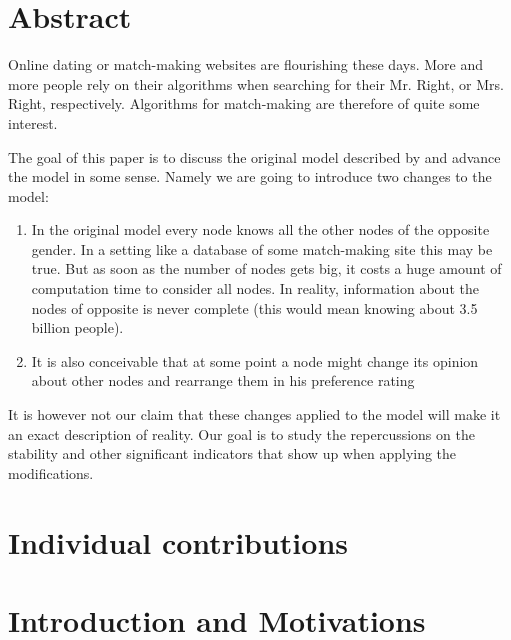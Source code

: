 \documentclass[11pt]{article}
\begin{document}
\newpage

\tableofcontents

\newpage

\setcounter{page}{1} %




\section{Abstract}

Online dating or match-making websites are flourishing these days. More and more people rely on their algorithms when searching for their Mr. Right, or Mrs. Right, respectively. Algorithms for match-making are therefore of quite some interest.


The goal of this paper is to discuss the original model described by \citet{1962} and advance the model in some sense. Namely we are going to introduce two changes to the model:

\begin{enumerate}
  \item In the original model every node knows all the other nodes of the opposite gender. In a setting like a database of some match-making site this may be true. But as soon as the number of nodes gets big, it costs a huge amount of computation time to consider all nodes. In reality, information about the nodes of opposite is never complete (this would mean knowing about 3.5 billion people).
  \item It is also conceivable that at some point a node might change its opinion about other nodes and rearrange them in his preference rating
\end{enumerate}

It is however not our claim that these changes applied to the model will make it an exact description of reality. Our goal is to study the repercussions on the stability and other significant indicators that show up when applying the modifications. 

\section{Individual contributions}

\section{Introduction and Motivations}
\end{document}
